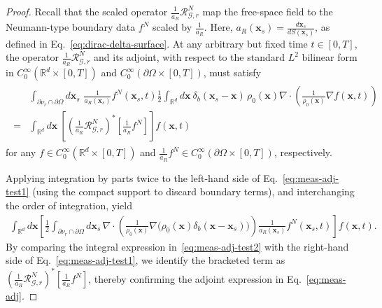 \documentclass[11pt,reqno]{amsart}
\theoremstyle{remark}
\theoremstyle{italic_lemma}
\newcommand{\bx}{\boldsymbol{x}}
\begin{document}
\begin{proof}
Recall that the scaled operator \(   \frac{1}{a_R}\mathcal{R}_{\mathcal{G},r}^N  \) map the free-space field to the Neumann-type boundary data
\(   f^N \) scaled by \( \frac{1}{a_R} \). Here, \(a_R(\bx_s) = \frac{d\bx_s}{dS(\bx_s) } \), as defined in Eq.~\eqref{eq:dirac-delta-surface}. At any arbitrary but fixed time \( t \in [0, T] \), the operator \(   \frac{1}{a_R}\mathcal{R}_{\mathcal{G},r}^N  \) and its adjoint, with respect to the standard \( L^2 \) bilinear form in  \( C_0^{\infty}(\mathbb{R}^d \times [0,T]) \) and \( C_0^{\infty}(\partial \Omega \times [0,T]) \), must satisfy
\begin{align}\label{eq:meas-adj-test1}
\begin{split}
 & \int_{\partial \nu_r \cap \partial \Omega} d\bx_s \,\, \frac{1}{a_R(\bx_s)}  f^N(\bx_s,t) \frac{1}{2} \int_{\mathbb{R}^d} d\bx \ \delta_b(\bx_s - \bx)\, \rho_0(\bx) \nabla \cdot \left( \frac{1}{\rho_0(\bx)} \nabla f(\bx, t) \right) \\
= & \int_{\mathbb{R}^d} d\bx \ \left[ \left( \frac{1}{a_R} \mathcal{R}_{\mathcal{G},r}^N \right)^* [\frac{1}{a_R} f^N]\right] f(\bx, t)
\end{split}
\end{align}
for any \( f \in C_0^{\infty}(\mathbb{R}^d \times [0,T]) \) and \( \frac{1}{a_R} f^N \in C_0^{\infty}(\partial \Omega \times [0, T]) \), respectively. 

Applying integration by parts twice to the left-hand side of Eq.~\eqref{eq:meas-adj-test1} (using the compact support to discard boundary terms), and interchanging the order of integration, yield
\begin{align}  \label{eq:meas-adj-test2} 
   \int_{\mathbb{R}^d} d\bx \left[ \frac{1}{2} \int_{\partial \nu_r \cap \partial \Omega} d\bx_s \, \nabla \cdot \left( \frac{1}{\rho_0 (\bx)} \nabla \Big( \rho_0(\bx) \delta_b(\bx - \bx_s) \Big) \right) \frac{1}{a_R(\bx_s)} f^N(\bx_s, t) \right] f(\bx, t).
\end{align}
By comparing the integral expression in~\eqref{eq:meas-adj-test2} with the right-hand side of Eq.~\eqref{eq:meas-adj-test1}, we identify the bracketed term as \( \left( \frac{1}{a_R} \mathcal{R}_{\mathcal{G},r}^N \right)^* [\frac{1}{a_R} f^N] \), thereby confirming the adjoint expression in Eq.~\eqref{eq:meas-adj}.
\end{proof}
\end{document}
